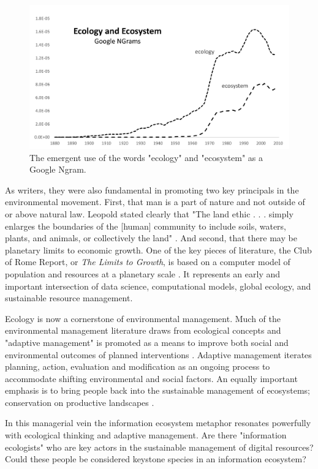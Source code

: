  \begin{figure}[!ht]
  \centering
    \includegraphics[width=5.5in]{figures/ecologyEcosystem}
  \caption{The emergent use of the words "ecology" and "ecosystem" as a Google Ngram.}
\end{figure}
 
As writers, they were also fundamental in promoting two key principals in the environmental movement. First, that man is a part of nature and not outside of or above natural law. Leopold stated clearly that "The land ethic . . . simply enlarges the boundaries of the [human] community to include soils, waters, plants, and animals, or collectively the land" \citep[][p. 204]{leopold_1949}. And second, that there may be planetary limits to economic growth. One of the key pieces of literature, the Club of Rome Report, or \textit{The Limits to Growth}, is based on a computer model of population and resources at a planetary scale \citep{meadows_1972}. It represents an early and important intersection of data science, computational models, global ecology, and sustainable resource management.
 
Ecology is now a cornerstone of environmental management. Much of the environmental management literature draws from ecological concepts and "adaptive management" is promoted as a means to improve both social and environmental outcomes of planned interventions \citep{holling_1978,leopold_1963}. Adaptive management iterates planning, action, evaluation and modification as an ongoing process to accommodate shifting environmental and social factors. An equally important emphasis is to bring people back into the sustainable management of ecosystems; conservation on productive landscapes \citep{berkes_2000,holling_2002}. 

In this managerial vein the information ecosystem metaphor resonates powerfully with ecological thinking and adaptive management. Are there "information ecologists" who are key actors in the sustainable management of digital resources? Could these people be considered keystone species in an information ecosystem?